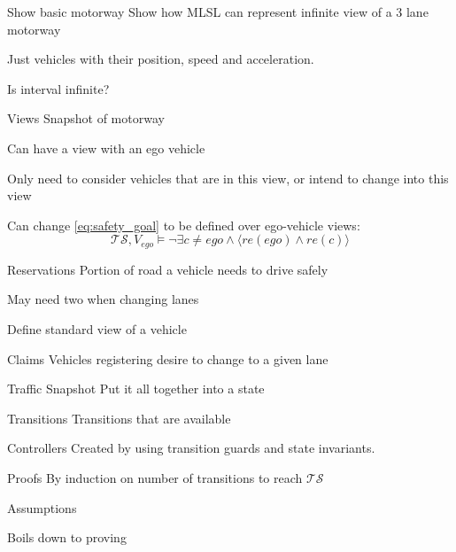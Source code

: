 \documentclass[xcolor=table]{beamer}
\begin{document}
\begin{frame}{Show basic motorway}
Show how MLSL can represent infinite view of a 3 lane motorway

Just vehicles with their position, speed and acceleration.

Is interval infinite?
\end{frame}

\begin{frame}{Views}
Snapshot of motorway

Can have a view with an ego vehicle

Only need to consider vehicles that are in this view, or intend to change into this view

Can change \cref{eq:safety_goal} to be defined over ego-vehicle views:
\begin{equation}\label{eq:safety_goal}
\mathcal{TS}, V_{ego} \models \neg \exists c \neq ego \land \langle re(ego) \land re(c)\rangle
\end{equation}
\end{frame}

\begin{frame}{Reservations}
Portion of road a vehicle needs to drive safely

May need two when changing lanes

Define standard view of a vehicle
\end{frame}

\begin{frame}{Claims}
Vehicles registering desire to change to a given lane
\end{frame}

\begin{frame}{Traffic Snapshot}
Put it all together into a state
\end{frame}

\begin{frame}{Transitions}
Transitions that are available
\end{frame}

\begin{frame}{Controllers}
Created by using transition guards and state invariants.
\end{frame}

\begin{frame}{Proofs}
By induction on number of transitions to reach $\mathcal{TS}$

Assumptions

Boils down to proving
\end{frame}
\end{document}
